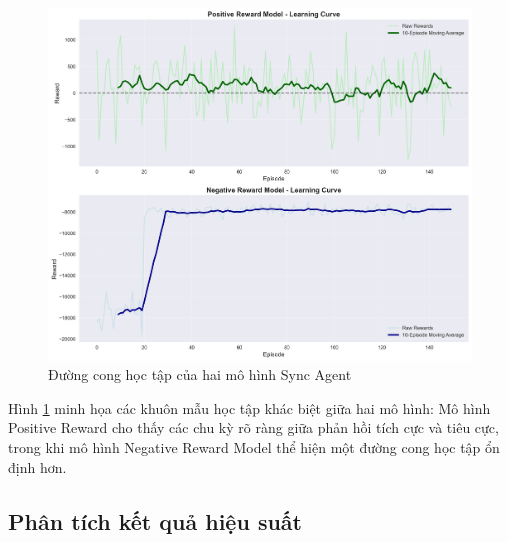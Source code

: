 \begin{figure}[!htp]
    \centering
    \includegraphics[width=\textwidth]{figures/sync_learning_curves.png}
    \caption{Đường cong học tập của hai mô hình Sync Agent}
    \label{fig:sync_learning_curves}
\end{figure}
Hình \ref{fig:sync_learning_curves} minh họa các khuôn mẫu học tập khác biệt
giữa hai mô hình: Mô hình Positive Reward cho thấy các
chu kỳ rõ ràng giữa phản hồi tích cực và tiêu cực, trong khi mô hình Negative Reward Model thể hiện một đường cong học tập ổn định hơn.
\subsection{Phân tích kết quả hiệu suất}

